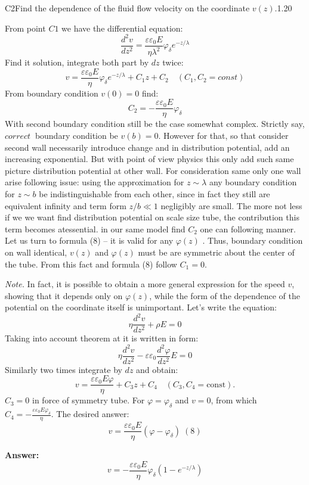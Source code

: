 \documentclass[11pt,a4paper]{article}
\begin{document}
\begin{solcard}{C2}{Find the dependence of the fluid flow velocity on the coordinate $v(z)$.}{1.20}

From point $C1$ we have the differential equation: $$ \frac{d^2 v}{dz^2} =  \frac{\varepsilon \varepsilon_0 E}{ \eta \lambda^2} \varphi_\delta e^{-z/\lambda } $$ Find it solution, integrate both part by $dz$ twice: $$ v = \frac{\varepsilon \varepsilon_0 E}{ \eta} \varphi_\delta e^{-z/\lambda } + C_1z + C_2 \quad (C_1, C_2 = const) $$ From boundary condition $v(0) = 0$ find: $$ C_2 = -\frac{\varepsilon \varepsilon_0 E}{ \eta} \varphi_\delta $$ With second boundary condition still be the case somewhat complex. Strictly say, $\textit{correct}\:$ boundary condition be $v(b)=0$. However for that, so that consider second wall necessarily introduce change and in distribution potential, add an increasing exponential. But with point of view physics this only add such same picture distribution potential at other wall. For consideration same only one wall arise following issue: using the approximation for $z \sim \lambda$ any boundary condition for $z \sim b$ be indistinguishable from each other, since in fact they still are equivalent infinity and term form $z/b \ll 1$ negligibly are small. The more not less if we we want find distribution potential on scale size tube, the contribution this term becomes atessential. in our same model find $C_2$ one can following manner. Let us turn to formula (8) – it is valid for any $\varphi (z)$ . Thus, boundary condition on wall identical, $v(z)$ and $\varphi (z)$ must be are symmetric about the center of the tube.  From this fact and formula (8) follow $C_1 = 0 $.


\textit{Note.} In fact, it is possible to obtain a more general expression for the speed $v$, showing that it depends only on $\varphi (z)$, while the form of the dependence of the potential on the coordinate itself is unimportant. Let's write the equation: $$ \eta\frac{d^2v}{dz^2} + \rho E = 0 $$ Taking into account theorem at it is written in form: $$ \eta\frac{d^2v}{dz^2} - \varepsilon \varepsilon_0 \frac{d^2 \varphi}{dz^2} E = 0 $$ Similarly two times integrate by $dz$ and obtain: $$ v =\frac{ \varepsilon \varepsilon_0 E \varphi}{\eta} + C_3 z + C_4 \quad (C_3, C_4 = \text{const}). $$ $C_3 = 0$ in force of symmetry tube. For $\varphi = \varphi_\delta$ and $v=0$, from which $C_4 = -\frac{ \varepsilon \varepsilon_0 E \varphi_\delta}{\eta}$. The desired answer: $$ v = \frac{ \varepsilon \varepsilon_0 E}{\eta}(\varphi - \varphi_\delta) \;(\text{8}) $$

\par\smallskip\noindent\textbf{Answer:} $$ v =-\frac{\varepsilon \varepsilon_0 E}{\eta} \varphi_\delta \left( 1- e^{- z/\lambda} \right) $$
\end{solcard}
\end{document}
